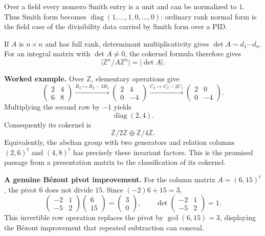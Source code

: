 Over a field every nonzero Smith entry is a unit and can be normalized to
\(1\). Thus Smith form becomes
\(\operatorname{diag}(1,\ldots,1,0,\ldots,0)\): ordinary rank normal form is
the field case of the divisibility data carried by Smith form over a PID.

If \(A\) is \(n\times n\) and has full rank, determinant multiplicativity
gives \(\det A\sim d_1\cdots d_n\). For an integral matrix with
\(\det A\ne0\), the cokernel formula therefore gives
\[
\lvert\mathbb Z^n/A\mathbb Z^n\rvert=\lvert\det A\rvert.
\]

\noindent\textbf{Worked example.} Over \(\mathbb Z\), elementary operations
give
\[
\begin{pmatrix}2&4\\6&8\end{pmatrix}
\xrightarrow{R_2\mapsto R_2-3R_1}
\begin{pmatrix}2&4\\0&-4\end{pmatrix}
\xrightarrow{C_2\mapsto C_2-2C_1}
\begin{pmatrix}2&0\\0&-4\end{pmatrix}.
\]
Multiplying the second row by \(-1\) yields
\[
\operatorname{diag}(2,4).
\]
Consequently its cokernel is
\[
\mathbb Z/2\mathbb Z\oplus\mathbb Z/4\mathbb Z.
\]
Equivalently, the abelian group with two generators and relation columns
\((2,6)^t\) and \((4,8)^t\) has precisely these invariant factors.  This is
the promised passage from a presentation matrix to the classification of its
cokernel.

\noindent\textbf{A genuine B\'ezout pivot improvement.}
For the column matrix \(A=(6,15)^t\), the pivot \(6\) does not divide \(15\).
Since \((-2)6+15=3\),
\[
\begin{pmatrix}-2&1\\-5&2\end{pmatrix}
\begin{pmatrix}6\\15\end{pmatrix}
=\begin{pmatrix}3\\0\end{pmatrix},
\qquad
\det\begin{pmatrix}-2&1\\-5&2\end{pmatrix}=1.
\]
This invertible row operation replaces the pivot by
\(\gcd(6,15)=3\), displaying the B\'ezout improvement that repeated
subtraction can conceal.

